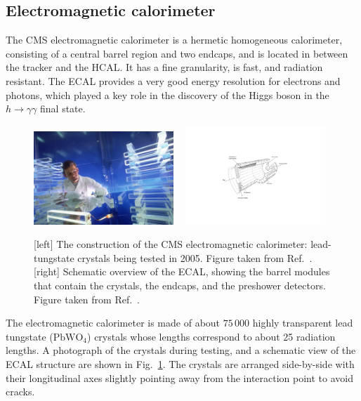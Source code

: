 \subsection{Electromagnetic calorimeter \label{sec:cms_ecal}}

The CMS electromagnetic calorimeter is a hermetic homogeneous calorimeter, consisting of a central
barrel region and two endcaps, and is located in between the tracker and the HCAL. 
It has a fine granularity, is fast, and radiation resistant.
The ECAL provides a very good energy resolution for electrons and photons, which played a key role
in the discovery of the Higgs boson in the $h\rightarrow\gamma\gamma$ final state. 

\begin{figure}[tpb]
  \centering
  \includegraphics[width=0.47\textwidth]{figures/cms/cms_ecal_crystal}
~
  \includegraphics[width=0.47\textwidth]{figures/cms/CMS_ECAL}
  \caption{[left] The construction of the CMS electromagnetic calorimeter: lead-tungstate crystals
being tested in 2005. Figure taken from Ref.~\cite{CMS_ecal_crystal}.
[right] Schematic overview of the ECAL, showing the barrel modules that contain the crystals, the
endcaps, and the preshower detectors. Figure taken from Ref.~\cite{Chatrchyan:2008aa}.
  \label{fig:cms_ecal_crystal}}
\end{figure}

The electromagnetic calorimeter is made of about $75\,000$ highly transparent lead tungstate
($\text{PbWO}_\text{4}$)
crystals whose lengths correspond to about 25 radiation lengths. A photograph of the crystals
during testing, and a schematic view of the ECAL structure are shown in
Fig.~\ref{fig:cms_ecal_crystal}. The crystals are arranged side-by-side with their longitudinal axes
slightly pointing away from the interaction point to avoid cracks.

